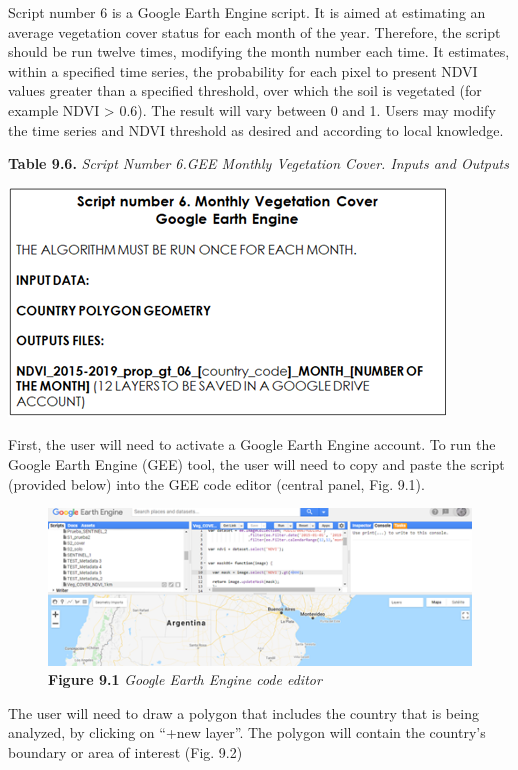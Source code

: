 \documentclass[
  10pt,
  b5paper,
]{book}
\begin{document}
Script number 6 is a Google Earth Engine script. It is aimed at estimating an average vegetation cover status for each month of the year. Therefore, the script should be run twelve times, modifying the month number each time. It estimates, within a specified time series, the probability for each pixel to present NDVI values greater than a specified threshold, over which the soil is vegetated (for example NDVI \textgreater{} 0.6). The result will vary between 0 and 1. Users may modify the time series and NDVI threshold as desired and according to local knowledge.

\textbf{Table 9.6.} \emph{Script Number 6.GEE Monthly Vegetation Cover. Inputs and Outputs}

\includegraphics{tables/Table_9.5.png}

First, the user will need to activate a Google Earth Engine account. To run the Google Earth Engine (GEE) tool, the user will need to copy and paste the script (provided below) into the GEE code editor (central panel, Fig. 9.1).

\begin{figure}
\centering
\includegraphics{images/Figure_9.1.png}
\caption{\textbf{Figure 9.1} \emph{Google Earth Engine code editor}}
\end{figure}

The user will need to draw a polygon that includes the country that is being analyzed, by clicking on ``+new layer''. The polygon will contain the country's boundary or area of interest (Fig. 9.2)
\end{document}
